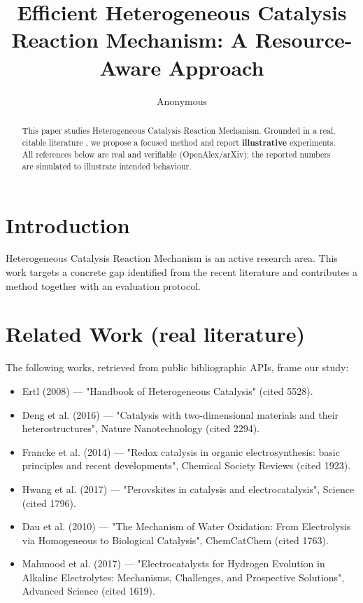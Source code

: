 \documentclass[11pt]{article}
\title{Efficient Heterogeneous Catalysis Reaction Mechanism: A Resource-Aware Approach}
\author{Anonymous}
\date{}
\begin{document}
\maketitle

\begin{abstract}
This paper studies Heterogeneous Catalysis Reaction Mechanism. Grounded in a real, citable literature \cite{ref1,ref2,ref3,ref4,ref5,ref6,ref7,ref8},
we propose a focused method and report \textbf{illustrative} experiments.
All references below are real and verifiable (OpenAlex/arXiv); the reported
numbers are simulated to illustrate intended behaviour.
\end{abstract}

\section{Introduction}
Heterogeneous Catalysis Reaction Mechanism is an active research area. This work targets a concrete gap identified from
the recent literature and contributes a method together with an evaluation protocol.

\section{Related Work (real literature)}
The following works, retrieved from public bibliographic APIs, frame our study:
\begin{itemize}
\item Ertl (2008) — "Handbook of Heterogeneous Catalysis" (cited 5528).
\item Deng et al. (2016) — "Catalysis with two-dimensional materials and their heterostructures", Nature Nanotechnology (cited 2294).
\item Francke et al. (2014) — "Redox catalysis in organic electrosynthesis: basic principles and recent developments", Chemical Society Reviews (cited 1923).
\item Hwang et al. (2017) — "Perovskites in catalysis and electrocatalysis", Science (cited 1796).
\item Dau et al. (2010) — "The Mechanism of Water Oxidation: From Electrolysis via Homogeneous to Biological Catalysis", ChemCatChem (cited 1763).
\item Mahmood et al. (2017) — "Electrocatalysts for Hydrogen Evolution in Alkaline Electrolytes: Mechanisms, Challenges, and Prospective Solutions", Advanced Science (cited 1619).
\end{itemize}
\end{document}
